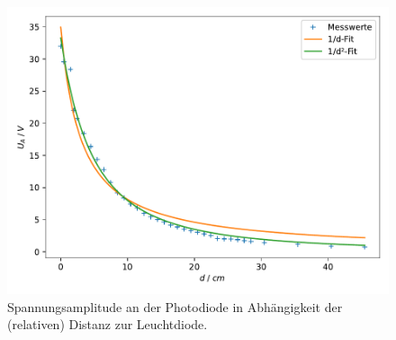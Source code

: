 \begin{figure}
  \centering
  \includegraphics[width=\textwidth]{build/plt/led.pdf}
  \caption{Spannungsamplitude an der Photodiode in Abhängigkeit der (relativen) Distanz zur Leuchtdiode.}
  \label{fig:plot_led}
\end{figure}
